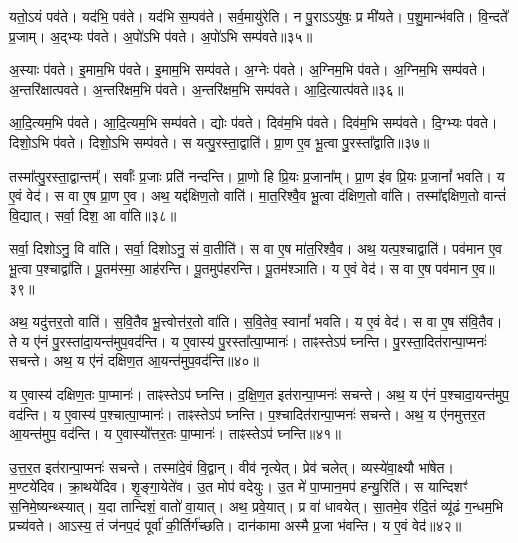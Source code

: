 यतो॒ऽयं पव॑ते।
यद॑भि॒ पव॑ते।
यद॑भि स॒म्पव॑ते।
सर्व॒मायु॑रेति।
न पु॒रा\-ऽऽयु॑षः॒ प्र मी॑यते।
प॒शु॒मान्भ॑वति।
वि॒न्दते᳚ प्र॒जाम्।
अ॒द्भ्यः प॑वते।
अ॒पो॑ऽभि प॑वते।
अ॒पो॑ऽभि सम्प॑वते॥३५॥

अ॒स्याः प॑वते।
इ॒माम॒भि प॑वते।
इ॒माम॒भि सम्प॑वते।
अ॒ग्नेः प॑वते।
अ॒ग्निम॒भि प॑वते।
अ॒ग्निम॒भि सम्प॑वते।
अ॒न्तरि॑क्षात्पवते।
अ॒न्तरि॑क्षम॒भि प॑वते।
अ॒न्तरि॑क्षम॒भि सम्प॑वते।
आ॒दि॒त्यात्प॑वते॥३६॥

आ॒दि॒त्यम॒भि प॑वते।
आ॒दि॒त्यम॒भि सम्प॑वते।
द्योः प॑वते।
दिव॑म॒भि प॑वते।
दिव॑म॒भि सम्प॑वते।
दि॒ग्भ्यः प॑वते।
दिशो॒ऽभि प॑वते।
दिशो॒ऽभि सम्प॑वते।
स यत्पु॒रस्ता॒द्वाति॑।
प्रा॒ण ए॒व भू॒त्वा पु॒रस्ता᳚द्वाति॥३७॥

तस्मा᳚त्पु॒रस्ता॒द्वान्तम्᳚।
सर्वाः᳚ प्र॒जाः प्रति॑ नन्दन्ति।
प्रा॒णो हि प्रि॒यः प्र॒जाना᳚म्।
प्रा॒ण इ॑व प्रि॒यः प्र॒जानां᳚ भवति।
य ए॒वं वेद॑।
स वा ए॒ष प्रा॒ण ए॒व।
अथ॒ यद्द॑क्षिण॒तो वाति॑।
मा॒त॒रिश्वै॒व भू॒त्वा द॑क्षिण॒तो वा॑ति।
तस्मा᳚द्दक्षिण॒तो वान्तं॑ वि॒द्यात्।
सर्वा॒ दिश॒ आ वा॑ति॥३८॥

सर्वा॒ दिशोऽनु॒ वि वा॑ति।
सर्वा॒ दिशोऽनु॒ सं वा॒तीति॑।
स वा ए॒ष मा॑त॒रिश्वै॒व।
अथ॒ यत्प॒श्चाद्वाति॑।
पव॑मान ए॒व भू॒त्वा प॒श्चाद्वा॑ति।
पू॒तम॑स्मा॒ आह॑रन्ति।
पू॒तमुप॑हरन्ति।
पू॒तम॑श्ञाति।
य ए॒वं वेद॑।
स वा ए॒ष पव॑मान ए॒व॥३९॥

अथ॒ यदु॑त्तर॒तो वाति॑।
स॒वि॒तैव भू॒त्त्वोत्त॑र॒तो वा॑ति।
स॒वि॒तेव॒ स्वानां᳚ भवति।
य ए॒वं वेद॑।
स वा ए॒ष स॑वि॒तैव।
ते य ए॑नं पु॒रस्ता॑दा॒यन्त॑मुप॒वद॑न्ति।
य ए॒वास्य॑ पु॒रस्ता᳚त्पा॒प्मानः॑।
ताꣴस्तेऽप॑ घ्नन्ति।
पु॒रस्ता॒दित॑रान्पा॒प्मनः॑ सचन्ते।
अथ॒ य ए॑नं दक्षिण॒त आ॒यन्त॑मुप॒वद॑न्ति॥४०॥

य ए॒वास्य॑ दक्षिण॒तः पा॒प्मानः॑।
ताꣴस्तेऽप॑ घ्नन्ति।
द॒क्षि॒ण॒त इत॑रान्पा॒प्मनः॑ सचन्ते।
अथ॒ य ए॑नं प॒श्चादा॒यन्त॑मुप॒ वद॑न्ति।
य ए॒वास्य॑ प॒श्चात्पा॒प्मानः॑।
ताꣴस्तेऽप॑ घ्नन्ति।
प॒श्चादित॑रान्पा॒प्मनः॑ सचन्ते।
अथ॒ य ए॑नमुत्तर॒त आ॒यन्त॑मुप॒ वद॑न्ति।
य ए॒वास्यो᳚त्तर॒तः पा॒प्मानः॑।
ताꣴस्तेऽप॑ घ्नन्ति॥४१॥

उ॒त्त॒र॒त इत॑रान्पा॒प्मनः॑ सचन्ते।
तस्मा॑दे॒वं वि॒द्वान्।
वीव॑ नृत्येत्।
प्रेव॑ चलेत्।
व्यस्ये॑वा॒क्ष्यौ भा॑षेत।
म॒ण्टये॑दिव।
क्रा॒थये॑दिव।
शृ॒ङ्गा॒येते॑व।
उ॒त मोप॑ वदेयुः।
उ॒त मे॑ पा॒प्मान॒मप॑ हन्यु॒रिति॑।
स यान्दिशꣳ॑ स॒निमे॒ष्यन्थ्स्यात्।
य॒दा तान्दिशं॒ वातो॑ वा॒यात्।
अथ॒ प्रवे॒यात्।
प्र वा॑ धावयेत्।
सा॒तमे॒व र॑दि॒तं व्यू॑ढं ग॒न्धम॒भि प्रच्य॑वते।
आऽस्य॒ तं ज॑नप॒दं पूर्वा॑ की॒र्तिर्ग॑च्छति।
दान॑कामा अस्मै प्र॒जा भ॑वन्ति।
य ए॒वं वेद॑॥४२॥\anuvakamend[वेद॒ सम्प॑वत आदि॒त्यात्प॑वते वा॒त्या वा᳚त्ये॒ष पव॑मान ए॒व द॑क्षिण॒त आ॒यन्त॑मुप॒ वद॑न्त्युत्तर॒तः पा॒प्मान॒स्ताꣴ स्तेप॑ घ्न॒न्तीत्य॒ष्टौ च॑]

